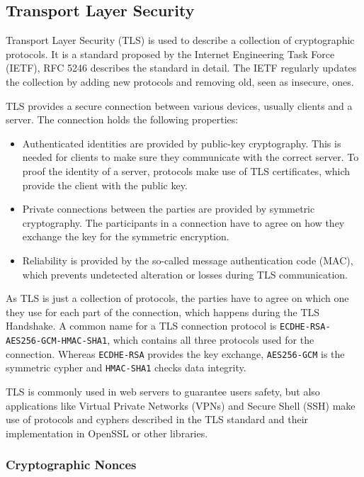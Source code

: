 \subsection{Transport Layer Security}

Transport Layer Security (TLS) is used to describe a collection of cryptographic
protocols. It is a standard proposed by the Internet Engineering Task Force
(IETF), RFC 5246\cite{rfc5246} describes the standard in detail. The IETF
regularly updates the collection by adding new protocols and removing old, seen
as insecure, ones.

TLS provides a secure connection between various devices, usually clients and a
server. The connection holds the following properties:
\begin{itemize}
  \item Authenticated identities are provided by public-key cryptography. This
is needed for clients to make sure they communicate with the correct server. To
proof the identity of a server, protocols make use of TLS certificates, which
provide the client with the public key.
  \item Private connections between the parties are provided by symmetric
cryptography. The participants in a connection have to agree on how they
exchange the key for the symmetric encryption.
  \item Reliability is provided by the so-called message authentication code
(MAC), which prevents undetected alteration or losses during TLS communication.
\end{itemize}

As TLS is just a collection of protocols, the parties have to agree on which one
they use for each part of the connection, which happens during the TLS
Handshake. A common name for a TLS connection protocol is
\texttt{ECDHE-RSA-AES256-GCM-HMAC-SHA1}, which contains all three protocols used
for the connection. Whereas \texttt{ECDHE-RSA} provides the key exchange,
\texttt{AES256-GCM} is the  symmetric cypher and \texttt{HMAC-SHA1} checks data
integrity.

TLS is commonly used in web servers to guarantee user\textquotesingle s safety,
but also applications like Virtual Private Networks (VPNs) and Secure Shell
(SSH) make use of protocols and cyphers described in the TLS standard and their
implementation in OpenSSL\cite{opensslweb} or other libraries.

\subsubsection{Cryptographic Nonces}

